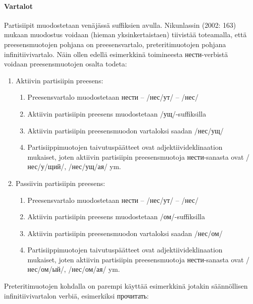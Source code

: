 \documentclass[]{scrartcl}
\providecommand{\tightlist}{%
  \setlength{\itemsep}{0pt}\setlength{\parskip}{0pt}}
\begin{document}
\paragraph{Vartalot}\label{vartalot}

Partisiipit muodostetaan venäjässä suffiksien avulla. Nikunlassin (2002:
163) mukaan muodostus voidaan (hieman yksinkertaistaen) tiivistää
toteamalla, että preesensmuotojen pohjana on preesensvartalo,
preteritimuotojen pohjana infinitiivivartalo. Näin ollen edellä
esimerkkinä toimineesta нести-verbistä voidaan preesensmuotojen osalta
todeta:

\begin{enumerate}
\def\labelenumi{\alph{enumi})}
\tightlist
\item
  Aktiivin partisiipin preesens:

  \begin{enumerate}
  \def\labelenumii{\arabic{enumii}.}
  \tightlist
  \item
    Preesensvartalo muodostetaan нести -- /нес/ут/ -- /нес/
  \item
    Aktiivin partisiipin preesens muodostetaan /ущ/-suffiksilla
  \item
    Aktiivin partisiipin preesensmuodon vartaloksi saadan /нес/ущ/
  \item
    Partisiippimuotojen taivutuspäätteet ovat adjektiivideklinaation
    mukaiset, joten aktiivin partisiipin preesensmuotoja нести-sanasta
    ovat /нес/у/щий/, /нес/ущ/ая/ ym.
  \end{enumerate}
\item
  Passiivin partisiipin preesens:

  \begin{enumerate}
  \def\labelenumii{\arabic{enumii}.}
  \tightlist
  \item
    Preesensvartalo muodostetaan нести -- /нес/ут/ -- /нес/
  \item
    Aktiivin partisiipin preesens muodostetaan /ом/-suffiksilla
  \item
    Aktiivin partisiipin preesensmuodon vartaloksi saadan /нес/ом/
  \item
    Partisiippimuotojen taivutuspäätteet ovat adjektiivideklinaation
    mukaiset, joten aktiivin partisiipin preesensmuotoja нести-sanasta
    ovat /нес/ом/ый/, /нес/ом/ая/ ym.
  \end{enumerate}
\end{enumerate}

Preteritimuotojen kohdalla on parempi käyttää esimerkkinä jotakin
säännöllisen infinitiivivartalon verbiä, esimerkiksi прочитать:
\end{document}
